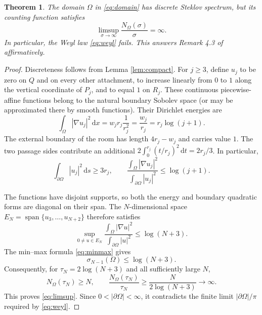 \documentclass[11pt]{article}
\newtheorem{theorem}{Theorem}
\newcommand{\Om}{\Omega}
\newcommand{\dd}{\,\mathrm d}
\begin{document}
\begin{theorem}\label{thm:main}
The domain $\Om$ in \eqref{eq:domain} has discrete Steklov spectrum, but its
counting function satisfies
\begin{equation}\label{eq:limsup}
 \limsup_{\sigma\to\infty}\frac{N_{\Om}(\sigma)}{\sigma}=\infty.
\end{equation}
In particular, the Weyl law \eqref{eq:weyl} fails.  This answers Remark 4.3
of \cite{KLP} affirmatively.
\end{theorem}

\begin{proof}
Discreteness follows from Lemma \ref{lem:compact}.  For $j\ge3$, define
$u_j$ to be zero on $Q$ and on every other attachment, to increase linearly
from $0$ to $1$ along the vertical coordinate of $P_j$, and to equal $1$ on
$R_j$.  These continuous piecewise-affine functions belong to the natural
boundary Sobolev space (or may be approximated there by smooth functions).
Their Dirichlet energies are
\begin{equation}\label{eq:energy}
 \int_\Om|\nabla u_j|^2\dd x
 =w_jr_j\frac1{r_j^2}
 =\frac{w_j}{r_j}=r_j\log(j+1).
\end{equation}
The external boundary of the room has length $4r_j-w_j$ and carries value
$1$.  The two passage sides contribute an additional
$2\int_0^{r_j}(t/r_j)^2\dd t=2r_j/3$.  In particular,
\begin{equation}\label{eq:mass}
 \int_{\partial\Om}|u_j|^2\dd s\ge 3r_j,
 \qquad
 \frac{\int_\Om|\nabla u_j|^2}
 {\int_{\partial\Om}|u_j|^2}\le\log(j+1).
\end{equation}

The functions have disjoint supports, so both the energy and boundary
quadratic forms are diagonal on their span.  The $N$-dimensional space
$E_N=\operatorname{span}\{u_3,\ldots,u_{N+2}\}$ therefore satisfies
\[
 \sup_{0\ne u\in E_N}
 \frac{\int_\Om|\nabla u|^2}
 {\int_{\partial\Om}|u|^2}
 \le\log(N+3).
\]
The min--max formula \eqref{eq:minmax} gives
\begin{equation}\label{eq:eigenbound}
 \sigma_{N-1}(\Om)\le\log(N+3).
\end{equation}
Consequently, for $\tau_N=2\log(N+3)$ and all sufficiently large $N$,
\[
 N_{\Om}(\tau_N)\ge N,
 \qquad
 \frac{N_{\Om}(\tau_N)}{\tau_N}
 \ge\frac{N}{2\log(N+3)}\longrightarrow\infty.
\]
This proves \eqref{eq:limsup}.  Since $0<|\partial\Om|<\infty$, it contradicts
the finite limit $|\partial\Om|/\pi$ required by \eqref{eq:weyl}.
\end{proof}
\end{document}
